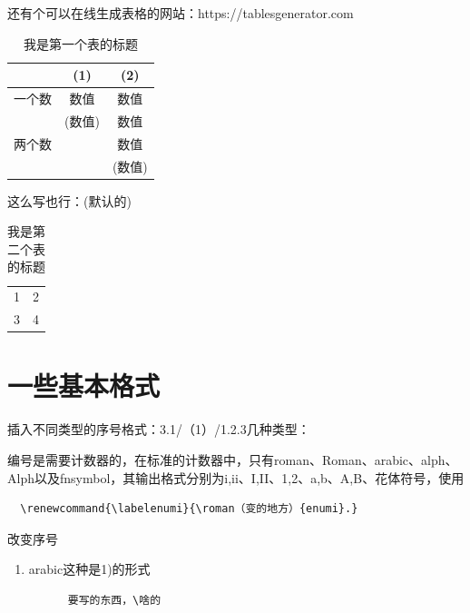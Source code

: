 \documentclass{article}
\begin{document}
    还有个可以在线生成表格的网站：https://tablesgenerator.com
    \begin{table}[htbp]
    \centering%
    
    \caption{我是第一个表的标题}
    \label{几个数}
    \begin{tabular}{lcc}%
    \toprule
                  &     (1)    &      (2)      \\
    \midrule
    一个数         &    数值     &     数值     \\
                  &    (数值)   &     数值    \\
    两个数         &            &      数值   \\
                  &            &      (数值)   \\
    \bottomrule
    \end{tabular}%
  
\end{table}%

 这么写也行：(默认的)
 
 \begin{table}[htbp]
     \centering
     \begin{tabular}{c|c}
         1 & 2 \\
         3 & 4
     \end{tabular}
     \caption{我是第二个表的标题}
     \label{一个标签}
 \end{table}
    
\section{一些基本格式}
    插入不同类型的序号格式：3.1/（1）/1.2.3几种类型：

编号是需要计数器的，在标准的计数器中，只有roman、Roman、arabic、alph、Alph以及fnsymbol，其输出格式分别为i,ii、I,II、1,2、a,b、A,B、花体符号，使用
\begin{lstlisting}
  \renewcommand{\labelenumi}{\roman（变的地方）{enumi}.} 
\end{lstlisting}
改变序号
    
\begin{enumerate}
\item arabic这种是1)的形式\\
    \begin{lstlisting}
      要写的东西，\啥的
    \end{lstlisting}
    
\end{enumerate}
\end{document}
